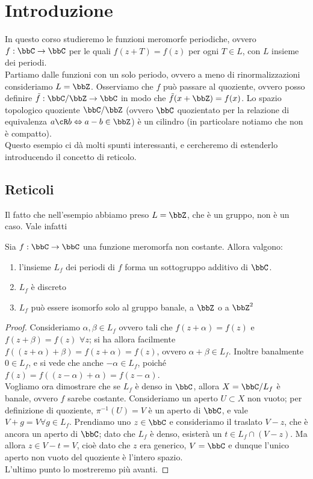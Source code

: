 \chapter{Introduzione}

In questo corso studieremo le funzioni meromorfe periodiche, ovvero $f:\bbC\to\bbC$ per le quali $f(z+T)=f(z)$ per ogni $T\in L$, con $L$ insieme dei periodi.\\
Partiamo dalle funzioni con un solo periodo, ovvero a meno di rinormalizzazioni consideriamo $L=\bbZ$.  Osserviamo che $f$ può passare al quoziente, ovvero posso definire $\tilde f:\bbC / \bbZ\to\bbC$ in modo che $\tilde f(x+\bbZ)=f(x)$. Lo spazio topologico quoziente $\bbC / \bbZ$ (ovvero $\bbC$ quozientato per la relazione di equivalenza $a \cR b \sse a-b \in \bbZ$) è un cilindro (in particolare notiamo che non è compatto).\\
Questo esempio ci dà molti spunti interessanti, e cercheremo di estenderlo introducendo il concetto di reticolo.\\

\section{Reticoli}
Il fatto che nell'esempio abbiamo preso $L=\bbZ$, che è un gruppo, non è un caso. Vale infatti
\begin{lemma}
  Sia $f: \bbC \rar \bbC$ una funzione meromorfa non costante.  Allora valgono:
  \begin{enumerate}
      \item l'insieme $L_f$ dei periodi di $f$ forma un sottogruppo additivo di $\bbC$.
      \item $L_f$ è discreto
      \item $L_f$ può essere isomorfo solo al gruppo banale, a $\bbZ$ o a $\bbZ^2$
  \end{enumerate}
\end{lemma}
\begin{proof}
      Consideriamo $\alpha,\beta\in L_f$ ovvero tali che $f(z + \alpha) = f(z)$ e $f(z + \beta) = f(z)$ $\forall z$; si ha allora facilmente $f((z + \alpha) + \beta) = f(z + \alpha) = f(z)$, ovvero $\alpha+\beta\in L_f$. Inoltre banalmente $0\in L_f$, e si vede che anche $-\alpha\in L_f$, poiché $f(z)=f((z-\alpha)+\alpha)=f(z-\alpha)$.\\
      Vogliamo ora dimostrare che se $L_f$ è denso in $\bbC$, allora $X=\bbC / L_f$ è banale, ovvero $f$ sarebe costante. Consideriamo un aperto $U\subset X$ non vuoto; per definizione di quoziente, $\pi^{-1}(U)=V$ è un aperto di $\bbC$, e vale $V+g=V\forall g\in L_f$. Prendiamo uno $z\in\bbC$ e consideriamo il traslato $V-z$, che è ancora un aperto di $\bbC$; dato che $L_f$ è denso, esisterà un $t\in L_f\cap (V-z)$. Ma allora $z\in V-t=V$, cioè dato che $z$ era generico, $V=\bbC$ e dunque l'unico aperto non vuoto del quoziente è l'intero spazio.\\
      L'ultimo punto lo mostreremo più avanti.
\end{proof}

